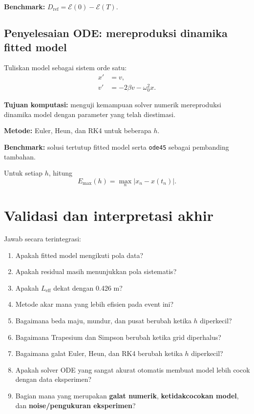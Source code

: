 \documentclass[book,english,noindex,lean,nobackpage,nocopyright,noupdate,nofiglist,notablist]{enacom}
\begin{document}
\textbf{Benchmark:} $D_{\mathrm{ref}}=\mathcal E(0)-\mathcal E(T)$.

\subsection{Penyelesaian ODE: mereproduksi dinamika fitted model}
Tuliskan model sebagai sistem orde satu:
\begin{equation}
\begin{aligned}
x'&=v,\\
v'&=-2\beta v-\omega_0^2x.
\end{aligned}
\end{equation}

\textbf{Tujuan komputasi:} menguji kemampuan solver numerik mereproduksi dinamika model dengan parameter yang telah diestimasi.

\textbf{Metode:} Euler, Heun, dan RK4 untuk beberapa $h$.

\textbf{Benchmark:} solusi tertutup fitted model serta \texttt{ode45} sebagai pembanding tambahan.

Untuk setiap $h$, hitung
\[
E_{\max}(h)=\max_n|x_n-x(t_n)|.
\]

\section{Validasi dan interpretasi akhir}
Jawab secara terintegrasi:
\begin{enumerate}
\item Apakah fitted model mengikuti pola data?
\item Apakah residual masih menunjukkan pola sistematis?
\item Apakah $L_{\mathrm{eff}}$ dekat dengan 0.426 m?
\item Metode akar mana yang lebih efisien pada event ini?
\item Bagaimana beda maju, mundur, dan pusat berubah ketika $h$ diperkecil?
\item Bagaimana Trapesium dan Simpson berubah ketika grid diperhalus?
\item Bagaimana galat Euler, Heun, dan RK4 berubah ketika $h$ diperkecil?
\item Apakah solver ODE yang sangat akurat otomatis membuat model lebih cocok dengan data eksperimen?
\item Bagian mana yang merupakan \textbf{galat numerik}, \textbf{ketidakcocokan model}, dan \textbf{noise/pengukuran eksperimen}?
\end{enumerate}
\end{document}
